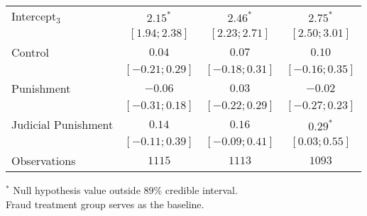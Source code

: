 \begin{table}[h]
\begin{center}
\begin{threeparttable}
\begin{tabular}{l c c c}
Intercept$_3$       & $2.15^{*}$        & $2.46^{*}$        & $2.75^{*}$        \\
                    & $ [ 1.94;  2.38]$ & $ [ 2.23;  2.71]$ & $ [ 2.50;  3.01]$ \\
Control             & $0.04$            & $0.07$            & $0.10$            \\
                    & $ [-0.21;  0.29]$ & $ [-0.18;  0.31]$ & $ [-0.16;  0.35]$ \\
Punishment          & $-0.06$           & $0.03$            & $-0.02$           \\
                    & $ [-0.31;  0.18]$ & $ [-0.22;  0.29]$ & $ [-0.27;  0.23]$ \\
Judicial Punishment & $0.14$            & $0.16$            & $0.29^{*}$        \\
                    & $ [-0.11;  0.39]$ & $ [-0.09;  0.41]$ & $ [ 0.03;  0.55]$ \\
\hline
Observations        & $1115$            & $1113$            & $1093$            \\
\hline
\end{tabular}
\begin{tablenotes}[flushleft]
\scriptsize{$^*$ Null hypothesis value outside 89\% credible interval.  \\
Fraud treatment group serves as the baseline.}
\end{tablenotes}
\end{threeparttable}
\label{table:ol_main_ru_npol_1201}
\end{center}
\end{table}
